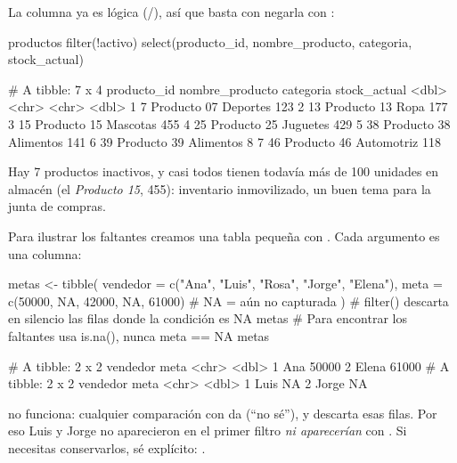 La columna  ya es lógica (/), así
que basta con negarla con \codigo{!}:

\begin{rcode}
productos %
  filter(!activo) %
  select(producto_id, nombre_producto, categoria, stock_actual)
\end{rcode}
\begin{rsalida}
# A tibble: 7 x 4
  producto_id nombre_producto categoria  stock_actual
        <dbl> <chr>           <chr>             <dbl>
1           7 Producto 07     Deportes            123
2          13 Producto 13     Ropa                177
3          15 Producto 15     Mascotas            455
4          25 Producto 25     Juguetes            429
5          38 Producto 38     Alimentos           141
6          39 Producto 39     Alimentos             8
7          46 Producto 46     Automotriz          118
\end{rsalida}

Hay 7 productos inactivos, y casi todos tienen todavía más de 100
unidades en almacén (el \emph{Producto 15}, 455): inventario inmovilizado,
un buen tema para la junta de compras.

Para ilustrar los faltantes creamos una tabla pequeña con
. Cada argumento es una columna:

\begin{rcode}
metas <- tibble(
  vendedor = c("Ana", "Luis", "Rosa", "Jorge", "Elena"),
  meta     = c(50000, NA, 42000, NA, 61000)   # NA = aún no capturada
)
# filter() descarta en silencio las filas donde la condición es NA
metas %
# Para encontrar los faltantes usa is.na(), nunca meta == NA
metas %
\end{rcode}
\begin{rsalida}
# A tibble: 2 x 2
  vendedor  meta
  <chr>    <dbl>
1 Ana      50000
2 Elena    61000
# A tibble: 2 x 2
  vendedor  meta
  <chr>    <dbl>
1 Luis        NA
2 Jorge       NA
\end{rsalida}

\begin{advertencia}
 no funciona: cualquier comparación con  da
 (``no sé''), y  descarta esas filas. Por eso
Luis y Jorge no aparecieron en el primer filtro \emph{ni aparecerían} con
. Si necesitas conservarlos, sé explícito:
.
\end{advertencia}

